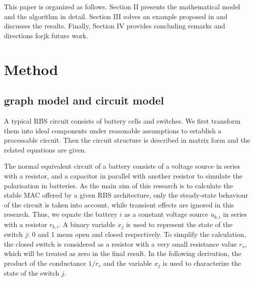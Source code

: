\documentclass{article}
\begin{document}
This paper is organized as follows. 
Section II presents the mathematical model and the algorithm in detail.
Section III solves an example proposed in \cite{kimDESADependableEfficient2012}and discusses the results. 
Finally, Section IV provides concluding remarks and directions forjk future work.

\section{Method}

\subsection{graph model and circuit model}

A typical RBS circuit consists of battery cells and switches.
We first transform them into ideal components under reasonable assumptions to establish a processable circuit.
Then the circuit structure is described in matrix form and the related equations are given.


The normal equivalent circuit of a battery consists of a voltage source in series with a resistor, and a capacitor in parallel with another resistor to simulate the polarisation in batteries.
As the main aim of this research is to calculate the stable MAC offered by a given RBS architecture, only the steady-state behaviour of the circuit is taken into account, while transient effects are ignored in this research.
Thus, we equate the battery $i$ as a constant voltage source $u_{b,i}$ in series with a resistor $r_{b,i}$.
A binary variable $x_j$ is used to represent the state of the switch $j$: 0 and 1 mean open and closed respectively.
To simplify the calculation, the closed switch is considered as a resistor with a very small resistance value $r_s$, which will be treated as zero in the final result.
In the following derivation, the product of the conductance $1/r_s$ and the variable $x_j$ is used to characterize the state of the switch $j$.
\end{document}
